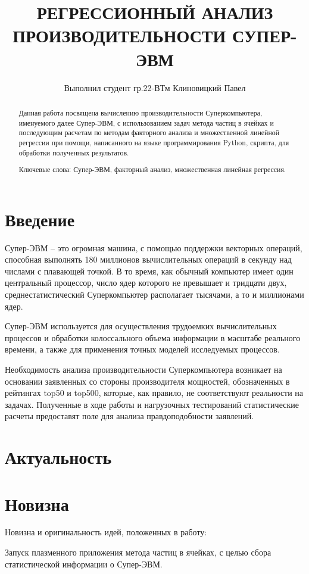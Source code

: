 \documentclass{article}
\title{РЕГРЕССИОННЫЙ АНАЛИЗ ПРОИЗВОДИТЕЛЬНОСТИ СУПЕР-ЭВМ}
\author{Выполнил студент гр.22-ВТм Клиновицкий Павел}
\begin{document}
\maketitle

\begin{abstract}
Данная работа посвящена вычислению производительности Суперкомпьютера, именуемого далее Супер-ЭВМ, с использованием задач метода частиц в ячейках и последующим расчетам по методам факторного анализа и множественной линейной регрессии при помощи, написанного на языке программирования Python, скрипта, для обработки полученных результатов.

Ключевые слова: Супер-ЭВМ, факторный анализ, множественная линейная регрессия.
\end{abstract}

\section{Введение}
Супер-ЭВМ – это огромная машина, с помощью поддержки векторных операций, способная выполнять 180 миллионов вычислительных операций в секунду над числами с плавающей точкой. В то время, как обычный компьютер имеет один центральный процессор, число ядер которого не превышает и тридцати двух, среднестатистический Суперкомпьютер располагает тысячами, а то и миллионами ядер.

Супер-ЭВМ используется для осуществления трудоемких вычислительных процессов и обработки колоссального объема информации в масштабе реального времени, а также для применения точных моделей исследуемых процессов.

Необходимость анализа производительности Суперкомпьютера возникает на основании заявленных со стороны производителя мощностей, обозначенных в рейтингах top50 и top500, которые, как правило, не соответствуют реальности на задачах. Полученные в ходе работы и нагрузочных тестирований статистические расчеты предоставят поле для анализа правдоподобности заявлений.

\section{Актуальность}

\section{Новизна}
Новизна и оригинальность идей, положенных в работу:

Запуск плазменного приложения метода частиц в ячейках, с целью сбора статистической информации о Супер-ЭВМ.
\end{document}
